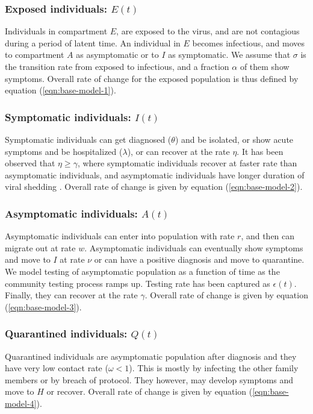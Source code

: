 \documentclass[authoryear,preprint]{elsarticle}
\begin{document}
\subsubsection{Exposed individuals: $E(t)$}
Individuals in compartment $E$, are exposed to the virus, and are not contagious during a period of latent time. An individual in $E$ becomes infectious, and moves to compartment $A$ as asymptomatic or to $I$ as symptomatic. We assume that $\sigma$ is the transition rate from exposed to infectious, and a fraction $\alpha$ of them show symptoms. Overall rate of change for the exposed population is thus defined by equation (\ref{eqn:base-model-1}).

\subsubsection{Symptomatic individuals: $I(t)$}
Symptomatic individuals can get diagnosed ($\theta$) and be isolated, or show acute symptoms and be hospitalized ($\lambda$), or can recover at the rate $\eta$. It has been observed that $\eta \geq \gamma$, where symptomatic individuals recover at faster rate than asymptomatic individuals, and asymptomatic individuals have longer duration of viral shedding \cite{Long2020}. Overall rate of change is given by equation (\ref{eqn:base-model-2}).

\subsubsection{Asymptomatic individuals: $A(t)$}
Asymptomatic individuals can enter into population with rate $r$, and then can migrate out at rate $w$. Asymptomatic individuals can eventually show symptoms and move to $I$ at rate $\nu$ or can have a positive diagnosis and move to quarantine. We model testing of asymptomatic population as a function of time as the community testing process ramps up. Testing rate has been captured as $\epsilon(t)$. Finally, they can recover at the rate $\gamma$. Overall rate of change is given by equation (\ref{eqn:base-model-3}).

\subsubsection{Quarantined individuals: $Q(t)$}
Quarantined individuals are asymptomatic population after diagnosis and they have very low contact rate ($\omega < 1$). This is mostly by infecting the other family members or by breach of protocol. They however, may develop symptoms and move to $H$ or recover. Overall rate of change is given by equation (\ref{eqn:base-model-4}).
\end{document}
